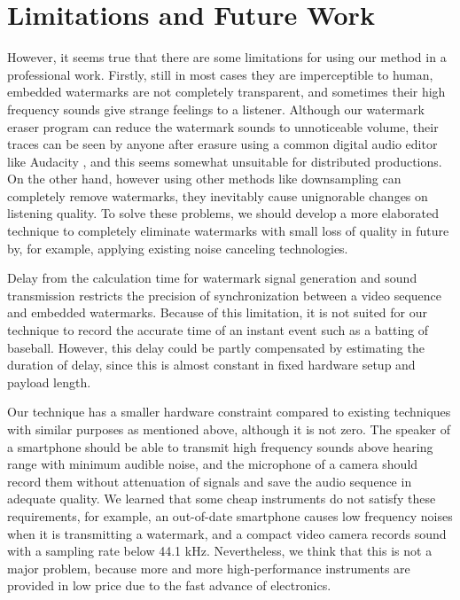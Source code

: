 \section{Limitations and Future Work}
However, it seems true that there are some limitations for using our method in a professional work.
Firstly, still in most cases they are imperceptible to human, embedded watermarks are not completely transparent, and sometimes their high frequency sounds give strange feelings to a listener.
Although our watermark eraser program can reduce the watermark sounds to unnoticeable volume, their traces can be seen by anyone after erasure using a common digital audio editor like Audacity \cite{audacity}, and this seems somewhat unsuitable for distributed productions.
On the other hand, however using other methods like downsampling can completely remove watermarks, they inevitably cause unignorable changes on listening quality.
To solve these problems, we should develop a more elaborated technique to completely eliminate watermarks with small loss of quality in future by, for example, applying existing noise canceling technologies.

Delay from the calculation time for watermark signal generation and sound transmission restricts the precision of synchronization between a video sequence and embedded watermarks.
Because of this limitation, it is not suited for our technique to record the accurate time of an instant event such as a batting of baseball.
However, this delay could be partly compensated by estimating the duration of delay, since this is almost constant in fixed hardware setup and payload length.

Our technique has a smaller hardware constraint compared to existing techniques with similar purposes as mentioned above, although it is not zero.
The speaker of a smartphone should be able to transmit high frequency sounds above hearing range with minimum audible noise, and the microphone of a camera should record them without attenuation of signals and save the audio sequence in adequate quality.
We learned that some cheap instruments do not satisfy these requirements, for example, an out-of-date smartphone causes low frequency noises when it is transmitting a watermark, and a compact video camera records sound with a sampling rate below 44.1 kHz.
Nevertheless, we think that this is not a major problem, because more and more high-performance instruments are provided in low price due to the fast advance of electronics.

